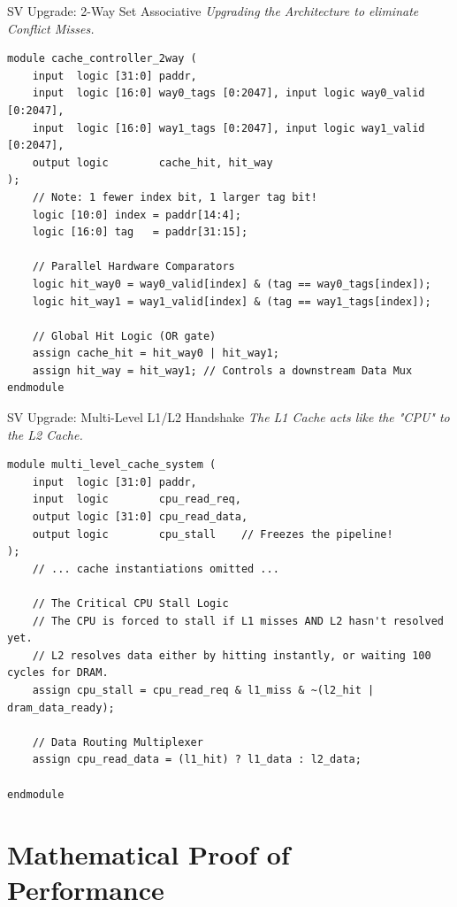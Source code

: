 \documentclass[aspectratio=169]{beamer}
\begin{document}
\begin{frame}[fragile]{SV Upgrade: 2-Way Set Associative}
\textit{Upgrading the Architecture to eliminate Conflict Misses.}
{\scriptsize
\begin{verbatim}
module cache_controller_2way (
    input  logic [31:0] paddr,       
    input  logic [16:0] way0_tags [0:2047], input logic way0_valid [0:2047],
    input  logic [16:0] way1_tags [0:2047], input logic way1_valid [0:2047],
    output logic        cache_hit, hit_way
);
    // Note: 1 fewer index bit, 1 larger tag bit!
    logic [10:0] index = paddr[14:4];
    logic [16:0] tag   = paddr[31:15]; 

    // Parallel Hardware Comparators
    logic hit_way0 = way0_valid[index] & (tag == way0_tags[index]);
    logic hit_way1 = way1_valid[index] & (tag == way1_tags[index]);

    // Global Hit Logic (OR gate)
    assign cache_hit = hit_way0 | hit_way1;
    assign hit_way = hit_way1; // Controls a downstream Data Mux
endmodule
\end{verbatim}
}
\end{frame}

\begin{frame}[fragile]{SV Upgrade: Multi-Level L1/L2 Handshake}
\textit{The L1 Cache acts like the "CPU" to the L2 Cache.}
{\scriptsize
\begin{verbatim}
module multi_level_cache_system (
    input  logic [31:0] paddr,
    input  logic        cpu_read_req,
    output logic [31:0] cpu_read_data,
    output logic        cpu_stall    // Freezes the pipeline!
);
    // ... cache instantiations omitted ...

    // The Critical CPU Stall Logic
    // The CPU is forced to stall if L1 misses AND L2 hasn't resolved yet.
    // L2 resolves data either by hitting instantly, or waiting 100 cycles for DRAM.
    assign cpu_stall = cpu_read_req & l1_miss & ~(l2_hit | dram_data_ready);

    // Data Routing Multiplexer
    assign cpu_read_data = (l1_hit) ? l1_data : l2_data;

endmodule
\end{verbatim}
}
\end{frame}

\section{Mathematical Proof of Performance}
\end{document}
